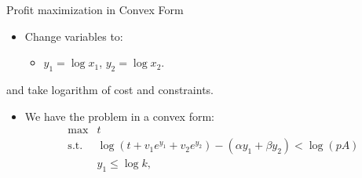 \documentclass[10pt,ignorenonframetext,serif,onlymath]{beamer}
\providecommand{\tightlist}{%
  \setlength{\itemsep}{0pt}\setlength{\parskip}{0pt}}
\begin{document}
\begin{frame}{Profit maximization in Convex Form}
\protect\hypertarget{sec:profit-maximization-in-convex-form}{}

\begin{itemize}
\item
  Change variables to:

  \begin{itemize}
  \tightlist
  \item
    \(y_1 = \log x_1\), \(y_2 = \log x_2\).
  \end{itemize}
\end{itemize}

and take logarithm of cost and constraints.

\begin{itemize}
\tightlist
\item
  We have the problem in a convex form: \[\begin{array}{ll}
    \text{max}  & t \\
    \text{s.t.} & \log(t + v_1 e^{y_1} + v_2 e^{y_2}) - (\alpha y_1 + \beta y_2) < \log(pA)  \\
                  & y_1 \le \log k ,
    \end{array}\]
\end{itemize}

\end{frame}
\end{document}
